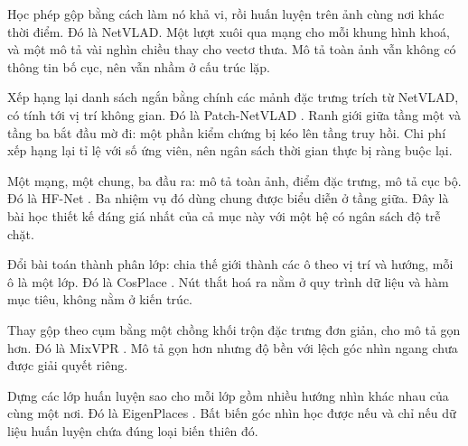 \documentclass[../../deep_learning.tex]{subfiles}
\begin{document}
\begin{mach}
\item {}
      \gp Học phép gộp bằng cách làm nó khả vi, rồi huấn luyện trên ảnh cùng nơi khác thời điểm. Đó là NetVLAD.
      \gia Một lượt xuôi qua mạng cho mỗi khung hình khoá, và một mô tả vài nghìn chiều thay cho vectơ thưa.
      \vdm Mô tả toàn ảnh vẫn không có thông tin bố cục, nên vẫn nhầm ở cấu trúc lặp.
\item {}
      \gp Xếp hạng lại danh sách ngắn bằng chính các mảnh đặc trưng trích từ NetVLAD, có tính tới vị trí không gian. Đó là Patch-NetVLAD \cite{f29hausler2021patch}.
      \hq Ranh giới giữa tầng một và tầng ba bắt đầu mờ đi: một phần kiểm chứng bị kéo lên tầng truy hồi.
      \gia Chi phí xếp hạng lại tỉ lệ với số ứng viên, nên ngân sách thời gian thực bị ràng buộc lại.
\item {}
      \gp Một mạng, một  chung, ba đầu ra: mô tả toàn ảnh, điểm đặc trưng, mô tả cục bộ. Đó là HF-Net \cite{f29sarlin2019coarse}.
      \gd Ba nhiệm vụ đó dùng chung được biểu diễn ở tầng giữa.
      \hq Đây là bài học thiết kế đáng giá nhất của cả mục này với một hệ có ngân sách độ trễ chặt.
\item {}
      \gp Đổi bài toán thành phân lớp: chia thế giới thành các ô theo vị trí và hướng, mỗi ô là một lớp. Đó là CosPlace \cite{f29berton2022rethinking}.
      \hq Nút thắt hoá ra nằm ở quy trình dữ liệu và hàm mục tiêu, không nằm ở kiến trúc.
\item {}
      \gp Thay gộp theo cụm bằng một chồng khối trộn đặc trưng đơn giản, cho mô tả gọn hơn. Đó là MixVPR \cite{f29alibey2023mixvpr}.
      \vdm Mô tả gọn hơn nhưng độ bền với lệch góc nhìn ngang chưa được giải quyết riêng.
\item {}
      \gp Dựng các lớp huấn luyện sao cho mỗi lớp gồm nhiều hướng nhìn khác nhau của cùng một nơi. Đó là EigenPlaces \cite{f29berton2023eigenplaces}.
      \gd Bất biến góc nhìn học được nếu và chỉ nếu dữ liệu huấn luyện chứa đúng loại biến thiên đó.
\item {}

\end{mach}
\end{document}

